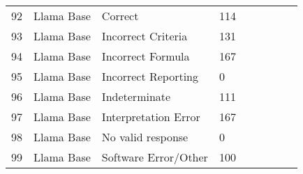 \begin{tabular}{|l|l|l|l|l|l|l|l|l|}
92 & Llama Base & Correct & 114 \\
93 & Llama Base & Incorrect Criteria & 131 \\
94 & Llama Base & Incorrect Formula & 167 \\
95 & Llama Base & Incorrect Reporting & 0 \\
96 & Llama Base & Indeterminate & 111 \\
97 & Llama Base & Interpretation Error & 167 \\
98 & Llama Base & No valid response & 0 \\
99 & Llama Base & Software Error/Other & 100 \\
\bottomrule
\end{tabular}
